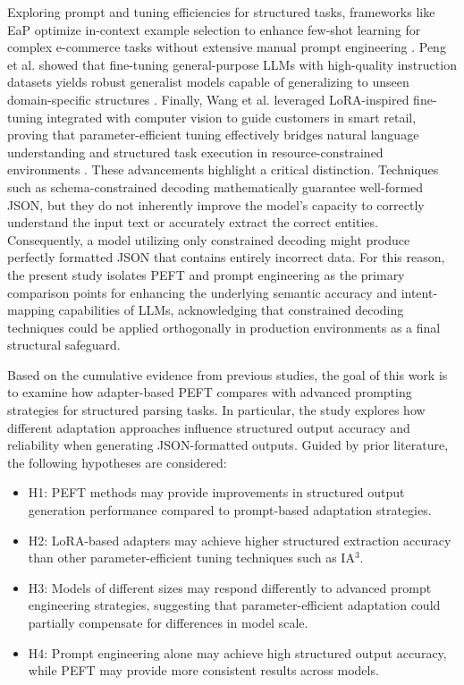 \documentclass[journal,article,submit,pdftex,moreauthors]{Definitions/mdpi}
\begin{document}
Exploring prompt and tuning efficiencies for structured tasks, frameworks like EaP optimize in-context example selection to enhance few-shot learning for complex e-commerce tasks without extensive manual prompt engineering \citep{zeng2025examples}. Peng et al. showed that fine-tuning general-purpose LLMs with high-quality instruction datasets yields robust generalist models capable of generalizing to unseen domain-specific structures \citep{peng2024ecellm}. Finally, Wang et al. leveraged LoRA-inspired fine-tuning integrated with computer vision to guide customers in smart retail, proving that parameter-efficient tuning effectively bridges natural language understanding and structured task execution in resource-constrained environments \citep{wang2024smart}.
These advancements highlight a critical distinction. Techniques such as schema-constrained decoding mathematically guarantee well-formed JSON, but they do not inherently improve the model's capacity to correctly understand the input text or accurately extract the correct entities. Consequently, a model utilizing only constrained decoding might produce perfectly formatted JSON that contains entirely incorrect data. For this reason, the present study isolates PEFT and prompt engineering as the primary comparison points for enhancing the underlying semantic accuracy and intent-mapping capabilities of LLMs, acknowledging that constrained decoding techniques could be applied orthogonally in production environments as a final structural safeguard.

Based on the cumulative evidence from previous studies, the goal of this work is to examine how adapter-based PEFT compares with advanced prompting strategies for structured parsing tasks. In particular, the study explores how different adaptation approaches influence structured output accuracy and reliability when generating JSON-formatted outputs. Guided by prior literature, the following hypotheses are considered:

\begin{itemize}

\item H1: PEFT methods may provide improvements in structured output generation performance compared to prompt-based adaptation strategies.

\item H2: LoRA-based adapters may achieve higher structured extraction accuracy than other parameter-efficient tuning techniques such as IA$^3$.

\item H3: Models of different sizes may respond differently to advanced prompt engineering strategies, suggesting that parameter-efficient adaptation could partially compensate for differences in model scale.

\item H4: Prompt engineering alone may achieve high structured output accuracy, while PEFT may provide more consistent results across models.

\end{itemize}
\end{document}
